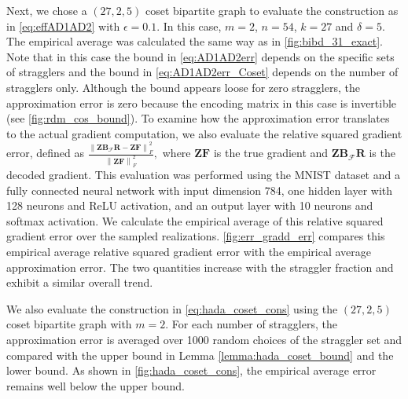 \documentclass[journal,draftcls,onecolumn]{IEEEtran}
\theoremstyle{mystyle}
\begin{document}
Next, we chose a $(27, 2, 5)$ coset bipartite graph to  evaluate the construction as in \eqref{eq:effAD1AD2} with $\epsilon = 0.1$. In this case, $ m = 2$, $n = 54$, $k = 27$ and $\delta = 5$. The empirical average was calculated the same way as in \autoref{fig:bibd_31_exact}. Note that in this case the bound in \eqref{eq:AD1AD2err} depends on the specific sets of stragglers and the bound in \eqref{eq:AD1AD2err_Coset} depends on the number of stragglers only. Although the bound appears loose for zero stragglers, the approximation error is zero because the encoding matrix in this case is invertible (see \autoref{fig:rdm_cos_bound}). To examine how the approximation error translates to the actual
gradient computation, we also evaluate the relative squared gradient error,
defined as
$
\frac{\left\|\mathbf{Z}\mathbf{B}_{\mathcal{F}}\mathbf{R}
-\mathbf{Z}\mathbf{F}\right\|_F^2}
{\left\|\mathbf{Z}\mathbf{F}\right\|_F^2},
$
where $\mathbf{Z}\mathbf{F}$ is the true gradient and
$\mathbf{Z}\mathbf{B}_{\mathcal{F}}\mathbf{R}$ is the decoded gradient. 
This evaluation was performed using the MNIST dataset and a fully connected neural network with input dimension 784, one hidden layer with 128 neurons and ReLU activation, and an output layer with 10 neurons and softmax activation. We calculate the empirical average of this
relative squared gradient error over the sampled realizations. \autoref{fig:err_gradd_err} compares this empirical average relative squared gradient error with the empirical average approximation error. The two
quantities increase with the straggler fraction and exhibit a similar
overall trend.

We also evaluate the construction in \eqref{eq:hada_coset_cons} using the $(27,2,5)$
coset bipartite graph with $m=2$. For each number of stragglers, the
approximation error is averaged over 1000 random choices of the straggler set and
compared with the upper bound in Lemma \ref{lemma:hada_coset_bound} and the lower bound.
As shown in \autoref{fig:hada_coset_cons}, the empirical average error remains well below the
upper bound.
\end{document}
